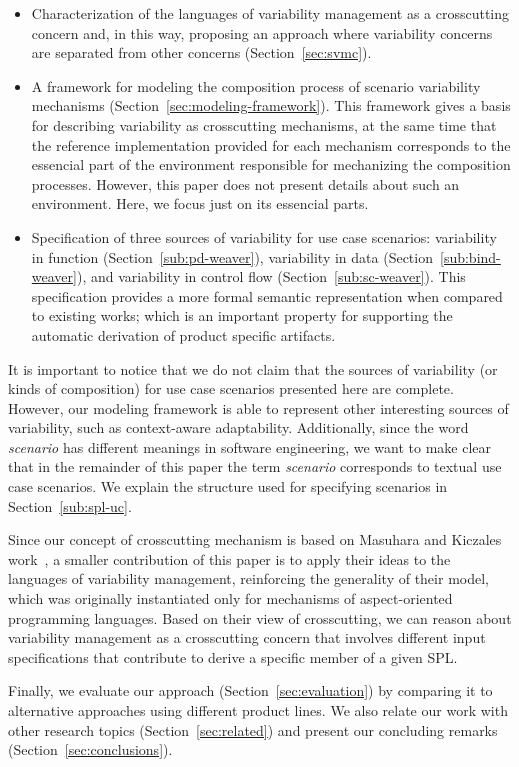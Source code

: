 \begin{itemize}
\item Characterization of the languages of variability management as a
crosscutting concern and, in this way, proposing an approach where variability
concerns are separated from other concerns (Section~\ref{sec:svmc}).


\item A framework for modeling the composition process of scenario variability
mechanisms (Section~\ref{sec:modeling-framework}). This framework gives a basis
for describing variability as crosscutting mechanisms, {\color{red}at the same
time that the reference implementation provided for each mechanism corresponds to the
essencial part of the environment responsible for mechanizing the composition
processes. However, this paper does not present details about such an environment. Here,
we focus just on its essencial parts.}

\item Specification of three {\color{red}sources of variability for use case
scenarios: variability in function (Section~\ref{sub:pd-weaver}),
variability in data (Section~\ref{sub:bind-weaver}), and variability in control
flow (Section~\ref{sub:sc-weaver})}. This specification provides a more formal
semantic representation when compared to existing works; which is an important property
for supporting the automatic derivation of product specific artifacts.
\end{itemize}

{\color{red}It is important to notice that we do not claim that the sources of
variability (or kinds of composition) for use case scenarios presented here are complete.
However, our modeling framework is able to represent
other interesting sources of variability, such as context-aware adaptability.
Additionally, since the word \emph{scenario} has different meanings in software
engineering, we want to make clear that in the remainder of this paper the term
\emph{scenario} corresponds to textual use case scenarios. We explain the structure
used for specifying scenarios in Section~\ref{sub:spl-uc}}.

Since our concept of crosscutting mechanism is based on Masuhara and Kiczales
work~\cite{Masuhara:2003aa}, a smaller contribution of this paper is to apply
their ideas to the languages of variability management,  reinforcing the
generality of their model, which was originally instantiated only for mechanisms
of aspect-oriented programming languages. Based on their view of crosscutting, we
can reason about variability management as a crosscutting concern that involves
different input specifications that contribute to derive a specific member of a
given SPL. 

Finally, we evaluate our approach (Section~\ref{sec:evaluation}) by comparing it
to alternative approaches using different product lines. We also relate our work
with other research topics (Section~\ref{sec:related}) and present our concluding
remarks (Section~\ref{sec:conclusions}). 